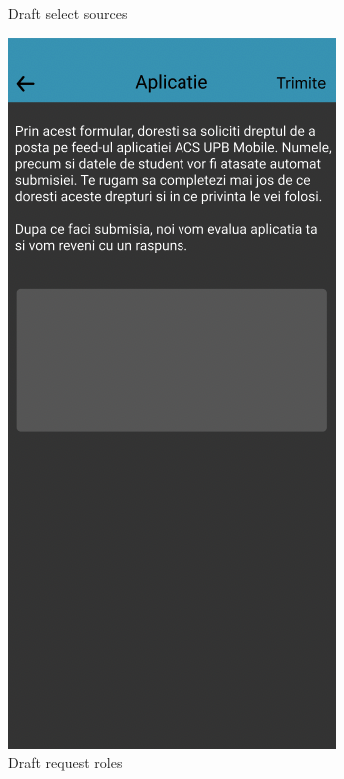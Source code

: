 \begin{figure}[!ht]
\begin{minipage}[t]{0.4\textwidth}
        \caption{Draft select sources}
        \label{4:fig:draft-select-sources-page}
    \end{minipage}
    \hfill
    \begin{minipage}[t]{0.4\textwidth}
        \captionsetup{justification=centering}
        \includegraphics[width=\textwidth]{figures/app/initial/request-role-draft.png}
        \caption{Draft request roles}
        \label{4:fig:draft-request-roles-page}
    \end{minipage}
\end{figure}

